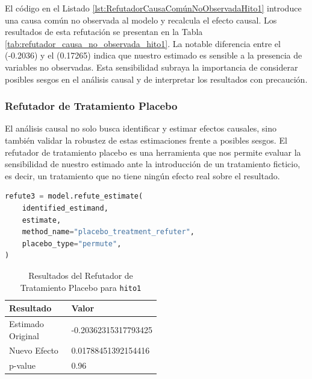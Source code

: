 El código en el Listado \ref{lst:RefutadorCausaComúnNoObservadaHito1} introduce una causa común no observada al modelo y recalcula el efecto causal. Los resultados de esta refutación se presentan en la Tabla \ref{tab:refutador_causa_no_observada_hito1}. La notable diferencia entre el  (-0.2036) y el  (0.17265) indica que nuestro estimado es sensible a la presencia de variables no observadas. Esta sensibilidad subraya la importancia de considerar posibles sesgos en el análisis causal y de interpretar los resultados con precaución.


\subsubsection{Refutador de Tratamiento Placebo}

El análisis causal no solo busca identificar y estimar efectos causales, sino también validar la robustez de estas estimaciones frente a posibles sesgos. El refutador de tratamiento placebo es una herramienta que nos permite evaluar la sensibilidad de nuestro estimado ante la introducción de un tratamiento ficticio, es decir, un tratamiento que no tiene ningún efecto real sobre el resultado.

\begin{minipage}{0.5\textwidth}
    \begin{lstlisting}[language=Python, caption=Refutador de tratamiento placebo para \texttt{hito1}, label=lst:RefutadorTratamientoPlaceboHito1]
refute3 = model.refute_estimate(
    identified_estimand,
    estimate,
    method_name="placebo_treatment_refuter",
    placebo_type="permute",
)
\end{lstlisting}
\end{minipage}
\hfill
\begin{minipage}{0.45\textwidth}
    \begin{table}[H]
        \centering
        \begin{tabular}{lp{0.5\linewidth}}
            \toprule
            \textbf{Resultado} & \textbf{Valor} \\
            \midrule
            Estimado Original & -0.20362315317793425  \\
            Nuevo Efecto & 0.01788451392154416 \\
            p-value & 0.96 \\
            \bottomrule
        \end{tabular}
        \caption{Resultados del Refutador de Tratamiento Placebo para \texttt{hito1}}
        \label{tab:refutador_placebo_hito1}
    \end{table}
\end{minipage}

